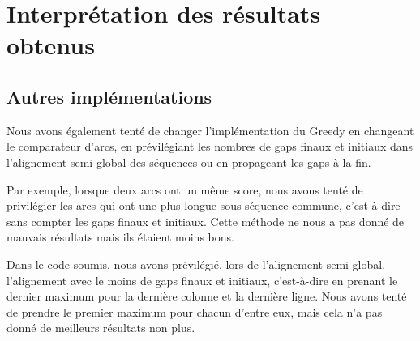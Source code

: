 
\section{Interprétation des résultats obtenus}

\subsection{Autres implémentations}

Nous avons également tenté de changer l'implémentation du Greedy en changeant
le comparateur d'arcs, en prévilégiant les nombres de gaps finaux et initiaux
dans l'alignement semi-global des séquences ou en propageant les gaps à la fin.

Par exemple, lorsque deux arcs ont un même score, nous avons tenté de
privilégier les arcs qui ont une plus longue sous-séquence commune, c'est-à-dire
sans compter les gaps finaux et initiaux. Cette méthode ne nous a pas donné de
mauvais résultats mais ils étaient moins bons.

Dans le code soumis, nous avons prévilégié, lors de l'alignement semi-global,
l'alignement avec le moins de gaps finaux et initiaux, c'est-à-dire en
prenant le dernier maximum pour la dernière colonne et la dernière ligne. Nous
avons tenté de prendre le premier maximum pour chacun d'entre eux, mais cela n'a
pas donné de meilleurs résultats non plus.

